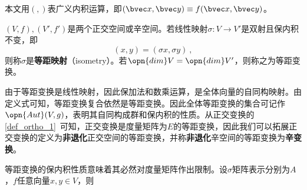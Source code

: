 本文用$(,)$表广义内积运算，即$(\bvec x,\bvec y)\equiv f(\bvec x,\bvec y) $。
\begin{definition}{}
$(V,f),(V',f')$是两个正交空间或辛空间。若线性映射$\sigma:V\rightarrow V'$是双射且保内积不变，即\begin{equation}
(x,y)=(\sigma x,\sigma y)~,
\end{equation}
则称$\sigma $是\textbf{等距映射}（isometry）。若$\opn{dim}V=\opn{dim}V'$，则称之为等距变换。
\end{definition}
由于等距变换是线性映射，因此保加法和数乘运算，是全体向量的自同构映射。由定义式可知，等距变换复合依然是等距变换。因此全体等距变换的集合可记作$\opn{Aut}(V,g)$，表明其自同构成群和保内积的性质。从正交变换的\autoref{def_ortho_1}~可知，正交变换是度量矩阵为$E$的等距变换，因此我们可以拓展正交变换的定义为\textbf{非退化}正交空间的等距变换，并称\textbf{非退化}辛空间的等距变换为\textbf{辛变换}。

等距变换的保内积性质意味着其必然对度量矩阵作出限制。设$\sigma$矩阵表示分别为$A$，$f$任意向量$x,y\in V$，则